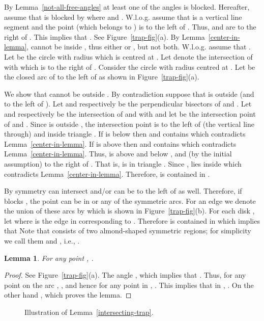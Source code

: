 \documentclass[11pt,a4paper]{article}
\newtheorem{lemma}{Lemma}
\begin{document}
By Lemma~\ref{not-all-free-angles} at least one of the angles is blocked. Hereafter, assume that  is blocked by  where  and . W.l.o.g. assume that  is a vertical line segment and the point  (which belongs to ) is to the left of . Thus,  and  are to the right of . This implies that . See Figure~\ref{trap-fig}(a). By Lemma~\ref{center-in-lemma},  cannot be inside , thus either  or , but not both. W.l.o.g. assume that . Let  be the circle with radius  which is centred at . Let  denote the intersection of  with  which is to the right of . Consider the circle  with radius  centred at . Let  be the closed arc of  to the left of  as shown in Figure~\ref{trap-fig}(a).

We show that  cannot be outside . By contradiction suppose that  is outside  (and to the left of ). Let  and  respectively be the perpendicular bisectors of  and . Let  and  respectively be the intersection of  and  with  and let  be the intersection point of  and . Since  is outside , the intersection point  is to the left of (the vertical line through)  and inside triangle . If  is below  then  and  contains  which contradicts Lemma~\ref{center-in-lemma}. If  is above  then  and  contains  which contradicts Lemma~\ref{center-in-lemma}. Thus,  is above  and below , and (by the initial assumption) to the right of . That is,  is in triangle . Since ,  lies inside  which contradicts Lemma~\ref{center-in-lemma}. Therefore,  is contained in . 

By symmetry  can intersect  and/or  can be to the left of  as well. Therefore, if  blocks , the point  can be in  or any of the symmetric arcs. For an edge  we denote the union of these arcs by  which is shown in Figure~\ref{trap-fig}(b). For each disk , let  where  is the edge in  corresponding to . Therefore  is contained in  which implies that  Note that  consists of two almond-shaped symmetric regions; for simplicity we call them  and , i.e., .

\begin{lemma}
\label{angle-in-trap}
 For any point , .
\end{lemma}
\begin{proof}
 See Figure~\ref{trap-fig}(a). The angle , which implies that . Thus, for any point  on the arc , , and hence for any point  in , . This implies that in , . On the other hand , which proves the lemma.
\end{proof}

\begin{figure}[htb]
  \centering
\setlength{\tabcolsep}{0in}
  
  \caption{Illustration of Lemma~\ref{intersecting-trap}.}
\label{trap-intersection-fig}
\end{figure}
\end{document}

